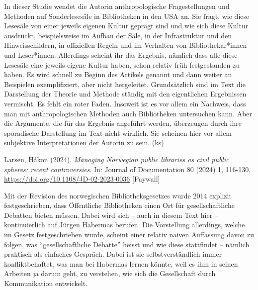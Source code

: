 \documentclass[a4paper,
fontsize=11pt,
oneside,
numbers=noperiodatend,
parskip=half-,
bibliography=totoc,
final
]{scrartcl}
\begin{document}
In dieser Studie wendet die Autorin anthropologische Fragestellungen und
Methoden auf Sonderlesesäle in Bibliotheken in den USA an. Sie fragt,
wie diese Lesesäle von einer jeweils eigenen Kultur geprägt sind und wie
sich diese Kultur ausdrückt, beispielsweise im Aufbau der Säle, in der
Infrastruktur und den Hinweisschildern, in offiziellen Regeln und im
Verhalten von Bibliothekar*innen und Leser*innen. Allerdings scheint ihr
das Ergebnis, nämlich dass alle diese Lesesäle eine jeweils eigene
Kultur haben, schon relativ früh festgestanden zu haben. Es wird schnell
zu Beginn des Artikels genannt und dann weiter an Beispielen
exemplifiziert, aber nicht hergeleitet. Grundsätzlich sind im Text die
Darstellung der Theorie und Methode ständig mit den eigentlichen
Ergebnissen vermischt. Es fehlt ein roter Faden. Insoweit ist es vor
allem ein Nachweis, dass man mit anthropologischen Methoden auch
Bibliotheken untersuchen kann. Aber die Argumente, die für das Ergebnis
angeführt werden, überzeugen durch ihre sporadische Darstellung im Text
nicht wirklich. Sie scheinen hier vor allem subjektive Interpretationen
der Autorin zu sein. (ks)

Larsen, Håkon (2024). \emph{Managing Norwegian public libraries as civil
public spheres: recent controversies}. In: Journal of Documentation 80
(2024) 1, 116-130, \url{https://doi.org/10.1108/JD-02-2023-0036}
{[}Paywall{]}

Mit der Revision des norwegischen Bibliotheksgesetzes wurde 2014
explizit festgeschrieben, dass Öffentliche Bibliotheken einen Ort für
gesellschaftliche Debatten bieten müssen. Dabei wird sich -- auch in
diesem Text hier -- kontinuierlich auf Jürgen Habermas berufen. Die
Vorstellung allerdings, welche im Gesetz festgeschrieben wurde, scheint
einer relativ naiven Auffassung davon zu folgen, was
\enquote{gesellschaftliche Debatte} heisst und wie diese stattfindet --
nämlich praktisch als einfaches Gespräch. Dabei ist sie
selbstverständlich immer konfliktbehaftet, was man bei Habermas lernen
könnte, weil es ihm in seinen Arbeiten ja darum geht, zu verstehen, wie
sich die Gesellschaft durch Kommunikation entwickelt.
\end{document}
